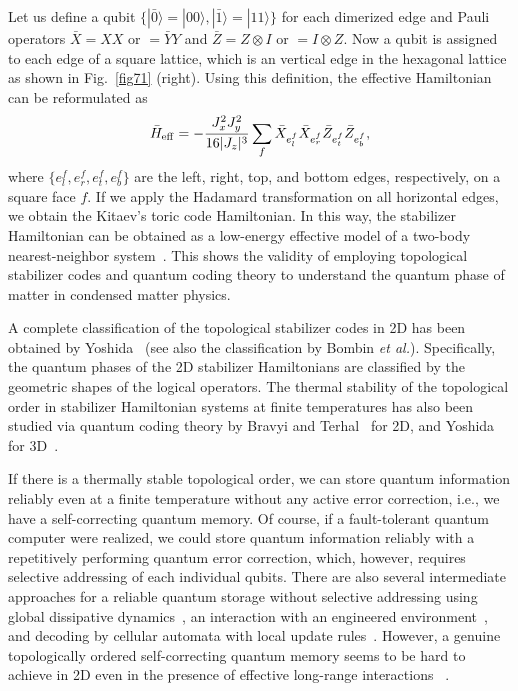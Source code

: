 Let us define a qubit $\{ |\bar 0 \rangle =|00\rangle , |\bar 1\rangle =|11\rangle \}$ for each dimerized edge and Pauli operators $\bar X= XX$ or $=\bar YY$ and 
$\bar Z= Z \otimes I$ or $=I \otimes Z$.
Now a qubit is assigned to each edge of a square lattice, which is an vertical edge in the hexagonal lattice as shown in Fig.~\ref{fig71} (right).
Using this definition, the effective Hamiltonian can be reformulated as
\begin{eqnarray}
\bar H_{\rm eff} = - \frac{J_x^2 J_y^2}{16|J_z|^3} \sum _{f} \bar X _{e_l^f} \bar X_{e_r^f} \bar Z_{e_t^f} \bar Z_{e_b^f},
\end{eqnarray}
where $\{ e_l^f, e_r^f, e_t^f, e_b^f\}$ are the left, right, top, and bottom edges, respectively, on a square face $f$.
If we apply the Hadamard transformation on all horizontal edges, we obtain the Kitaev's toric code Hamiltonian.
In this way, the stabilizer Hamiltonian can be obtained as a low-energy effective model of a two-body nearest-neighbor system~\cite{Kitaev06}.
This shows the validity of employing topological stabilizer codes and quantum coding theory to understand the quantum phase of matter in condensed matter physics.

A complete classification of the topological stabilizer codes in 2D has been obtained by Yoshida~\cite{BeniTopoStab} (see also the classification by 
Bombin {\it et al.}\cite{BombinTopoStab}).
Specifically, the quantum phases of the 2D stabilizer Hamiltonians are classified by the geometric shapes of the logical operators.
The thermal stability of the topological order in stabilizer Hamiltonian systems at finite temperatures has also been studied via quantum coding theory by Bravyi and Terhal~\cite{BravyiTerhal} for 2D, and Yoshida for 3D~\cite{BeniThermal3D}.


If there is a thermally stable topological order, we can store quantum information reliably even at a finite temperature without any active error correction, i.e., we have a  self-correcting quantum memory.
Of course, if a fault-tolerant quantum computer were realized, we could store quantum information reliably with a repetitively performing quantum error correction, which, however, requires selective addressing of each individual qubits.
There are also several intermediate approaches for a reliable quantum storage without selective addressing using global dissipative dynamics~\cite{MFTP}, an interaction with an engineered environment~\cite{ToricBoson,ToricBoson2,Kapit14}, and decoding by cellular automata with local update rules~\cite{AutomatonDec14,Harrington}.
However, a genuine topologically ordered self-correcting quantum memory
seems to be hard to achieve in 2D
even in the presence of effective long-range interactions
~\cite{Landon-Cardinal15}.



